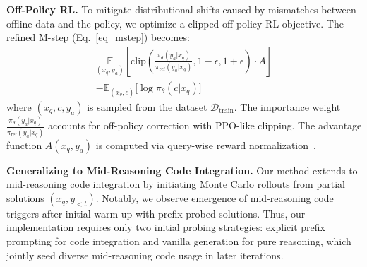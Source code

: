 \noindent\textbf{Off-Policy RL.}
To mitigate distributional shifts caused by mismatches between offline data and the policy, we optimize a clipped off-policy RL objective. The refined M-step (Eq.~\ref{eq_mstep}) becomes:
\begin{multline}
    \underset{(x_q,y_a)}{\mathbb{E}}\left[
\text{clip}\left(\frac{\pi_\theta(y_a|x_q)}{\pi_{\text{ref}}(y_a|x_q)},1-\epsilon,1+\epsilon\right)\cdot A\right]
\\-\mathbb{E}_{(x_q,c)}\Big[\log \pi_\theta(c|x_q) \Big]\label{eq_finalm}
\end{multline}
where  \( (x_q, c, y_a) \) is sampled from the dataset \( \mathcal{D}_{\text{train}} \). The importance weight \(\frac{\pi_\theta(y_a|x_q)}{\pi_{\text{ref}}(y_a|x_q)}\) accounts for off-policy correction with PPO-like clipping. The advantage function \(A(x_q,y_a)\) is computed via query-wise reward normalization~\cite{ppo}. 

\noindent\textbf{Generalizing to Mid-Reasoning Code Integration.} Our method extends to mid-reasoning code integration by initiating Monte Carlo rollouts from partial solutions \((x_q, y_{<t})\). Notably, we observe emergence of mid-reasoning code triggers after initial warm-up with prefix-probed solutions. Thus, our implementation requires only two initial probing strategies: explicit prefix prompting for code integration and vanilla generation for pure reasoning, which jointly seed diverse mid-reasoning code usage in later iterations.
